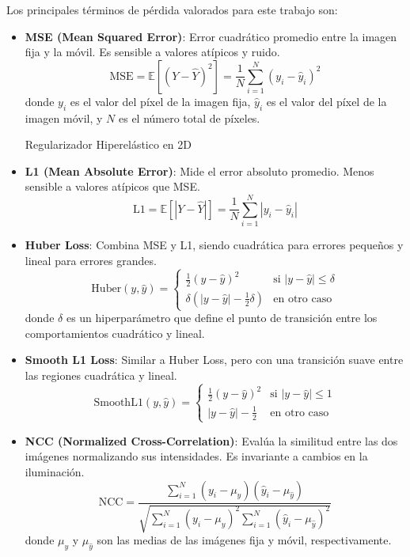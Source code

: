 Los principales términos de pérdida valorados para este trabajo son:

\begin{itemize}
    \item \textbf{MSE (Mean Squared Error)}:
    Error cuadrático promedio entre la imagen fija y la móvil. Es sensible a valores atípicos y ruido.
    \[
    \text{MSE} = \mathbb{E}[(Y - \hat{Y})^2] = \frac{1}{N} \sum_{i=1}^{N} (y_i - \hat{y}_i)^2
    \]
    donde \( y_i \) es el valor del píxel de la imagen fija, \( \hat{y}_i \) es el valor del píxel de la imagen móvil, y \( N \) es el número total de píxeles. \cite{Palubinskas02012017}

    Regularizador Hiperelástico en 2D   \item \textbf{L1 (Mean Absolute Error)}:
    Mide el error absoluto promedio. Menos sensible a valores atípicos que MSE.
    \[
    \text{L1} = \mathbb{E}[|Y - \hat{Y}|] = \frac{1}{N} \sum_{i=1}^{N} |y_i - \hat{y}_i|
    \]

    \item \textbf{Huber Loss}:
    Combina MSE y L1, siendo cuadrática para errores pequeños y lineal para errores grandes.
    \[
    \text{Huber}(y, \hat{y}) = \begin{cases}
    \frac{1}{2}(y - \hat{y})^2 & \text{si } |y - \hat{y}| \leq \delta \\
    \delta(|y - \hat{y}| - \frac{1}{2}\delta) & \text{en otro caso}
    \end{cases}
    \]
    donde \( \delta \) es un hiperparámetro que define el punto de transición entre los comportamientos cuadrático y lineal.

    \item \textbf{Smooth L1 Loss}:
    Similar a Huber Loss, pero con una transición suave entre las regiones cuadrática y lineal.
    \[
    \text{SmoothL1}(y, \hat{y}) = \begin{cases}
    \frac{1}{2}(y - \hat{y})^2 & \text{si } |y - \hat{y}| \leq 1 \\
    |y - \hat{y}| - \frac{1}{2} & \text{en otro caso}
    \end{cases}
    \]

    \item \textbf{NCC (Normalized Cross-Correlation)}:
    Evalúa la similitud entre las dos imágenes normalizando sus intensidades. Es invariante a cambios en la iluminación.
    \[
    \text{NCC} = \frac{\sum_{i=1}^{N} (y_i - \mu_y)(\hat{y}_i - \mu_{\hat{y}})}{\sqrt{\sum_{i=1}^{N} (y_i - \mu_y)^2 \sum_{i=1}^{N} (\hat{y}_i - \mu_{\hat{y}})^2}}
    \]
    donde \( \mu_y \) y \( \mu_{\hat{y}} \) son las medias de las imágenes fija y móvil, respectivamente.


\end{itemize}
